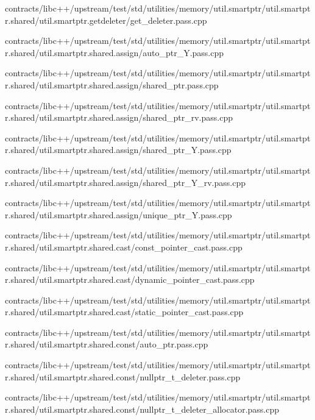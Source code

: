 \begin{DoxyCompactItemize}
contracts/libc++/upstream/test/std/utilities/memory/util.\+smartptr/util.\+smartptr.\+shared/util.\+smartptr.\+getdeleter/get\+\_\+deleter.\+pass.\+cpp\item 
contracts/libc++/upstream/test/std/utilities/memory/util.\+smartptr/util.\+smartptr.\+shared/util.\+smartptr.\+shared.\+assign/auto\+\_\+ptr\+\_\+\+Y.\+pass.\+cpp\item 
contracts/libc++/upstream/test/std/utilities/memory/util.\+smartptr/util.\+smartptr.\+shared/util.\+smartptr.\+shared.\+assign/shared\+\_\+ptr.\+pass.\+cpp\item 
contracts/libc++/upstream/test/std/utilities/memory/util.\+smartptr/util.\+smartptr.\+shared/util.\+smartptr.\+shared.\+assign/shared\+\_\+ptr\+\_\+rv.\+pass.\+cpp\item 
contracts/libc++/upstream/test/std/utilities/memory/util.\+smartptr/util.\+smartptr.\+shared/util.\+smartptr.\+shared.\+assign/shared\+\_\+ptr\+\_\+\+Y.\+pass.\+cpp\item 
contracts/libc++/upstream/test/std/utilities/memory/util.\+smartptr/util.\+smartptr.\+shared/util.\+smartptr.\+shared.\+assign/shared\+\_\+ptr\+\_\+\+Y\+\_\+rv.\+pass.\+cpp\item 
contracts/libc++/upstream/test/std/utilities/memory/util.\+smartptr/util.\+smartptr.\+shared/util.\+smartptr.\+shared.\+assign/unique\+\_\+ptr\+\_\+\+Y.\+pass.\+cpp\item 
contracts/libc++/upstream/test/std/utilities/memory/util.\+smartptr/util.\+smartptr.\+shared/util.\+smartptr.\+shared.\+cast/const\+\_\+pointer\+\_\+cast.\+pass.\+cpp\item 
contracts/libc++/upstream/test/std/utilities/memory/util.\+smartptr/util.\+smartptr.\+shared/util.\+smartptr.\+shared.\+cast/dynamic\+\_\+pointer\+\_\+cast.\+pass.\+cpp\item 
contracts/libc++/upstream/test/std/utilities/memory/util.\+smartptr/util.\+smartptr.\+shared/util.\+smartptr.\+shared.\+cast/static\+\_\+pointer\+\_\+cast.\+pass.\+cpp\item 
contracts/libc++/upstream/test/std/utilities/memory/util.\+smartptr/util.\+smartptr.\+shared/util.\+smartptr.\+shared.\+const/auto\+\_\+ptr.\+pass.\+cpp\item 
contracts/libc++/upstream/test/std/utilities/memory/util.\+smartptr/util.\+smartptr.\+shared/util.\+smartptr.\+shared.\+const/nullptr\+\_\+t\+\_\+deleter.\+pass.\+cpp\item 
contracts/libc++/upstream/test/std/utilities/memory/util.\+smartptr/util.\+smartptr.\+shared/util.\+smartptr.\+shared.\+const/nullptr\+\_\+t\+\_\+deleter\+\_\+allocator.\+pass.\+cpp\item 

\end{DoxyCompactItemize}

